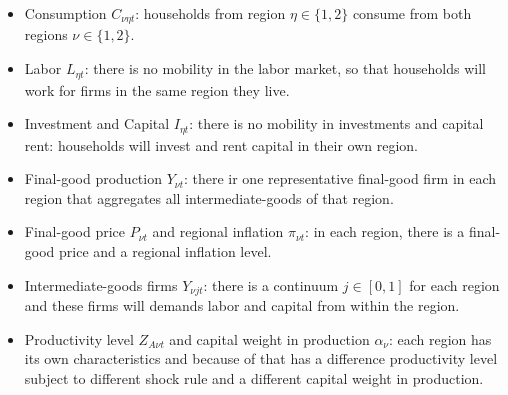\documentclass[
thesis.tex
]{subfiles}
\begin{document}
\begin{itemize}
	\item Consumption \(C_{\nu\eta t}\): households from region $\eta \in \{1,2\}$ consume from both regions $\nu \in \{1,2\}$.
	
	\item Labor \(L_{\eta t}\): there is no mobility in the labor market, so that households will work for firms in the same region they live.
	
	\item Investment and Capital \(I_{\eta t}\): there is no mobility in investments and capital rent: households will invest and rent capital in their own region.
	
	\item Final-good production \(Y_{\nu t}\): there ir one representative final-good firm in each region that aggregates all intermediate-goods of that region.
	
	\item Final-good price \(P_{\nu t}\) and regional inflation \(\pi_{\nu t}\): in each region, there is a final-good price and a regional inflation level.
	
	\item Intermediate-goods firms \(Y_{\nu jt}\): there is a continuum $j \in [0,1]$ for each region and these firms will demands labor and capital from within the region.
	
	\item Productivity level \(Z_{A\nu t}\) and capital weight in production $\alpha_{\nu}$: each region has its own characteristics and because of that has a difference productivity level subject to different shock rule and a different capital weight in production.
	
	\begin{comment}
		
		Determining whether the variable (or parameter) should be region-specific (or not) requires justification:
		
		\item Consumption \(C_{\nu\eta t}\) and \(I_{it}\): Consumption from region to region should vary based on the abundance of natural resources and the available technology in that region: each region will specialize in producing goods that are resource-intensive, considering the resources that are abundant in that specific region. This will increase the supply, decreasing their relative price and making them more demanded. Investment is decided based on the household maximization problem, in which consumption level must be decided regionally.
		

\end{comment}
\end{itemize}
\end{document}

